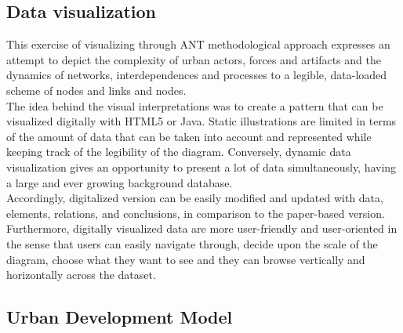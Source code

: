 \documentclass[11pt]{report}
\begin{document}
{\subsection{Data visualization}

This exercise of visualizing through ANT methodological approach expresses an attempt to depict the complexity of urban actors, forces and artifacts and the dynamics of networks, interdependences and processes to a legible, data-loaded scheme of nodes and links and nodes. 
\\
The idea behind the visual interpretations was to create a pattern that can be visualized digitally with HTML5 or Java.
Static illustrations are limited in terms of the amount of data that can be taken into account and represented while keeping track of the legibility of the diagram.
Conversely, dynamic data visualization gives an opportunity to present a lot of data simultaneously, having a large and ever growing background database. 
\\
Accordingly, digitalized version can be easily modified and updated with data, elements, relations, and conclusions, in comparison to the paper-based version.
Furthermore, digitally visualized data are more user-friendly and user-oriented in the sense that users can easily navigate through, decide upon the scale of the diagram, choose what they want to see and they can browse vertically and horizontally across the dataset.

\subsection{Urban Development Model}

}
\end{document}
